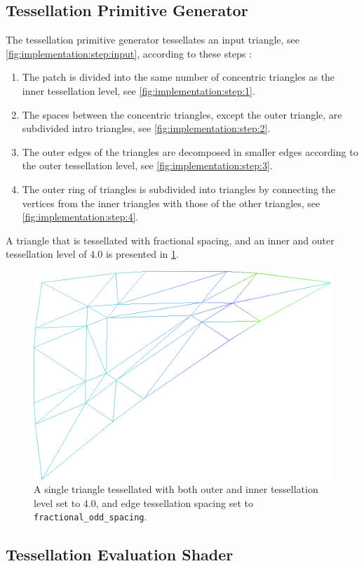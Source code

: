 \subsection{Tessellation Primitive Generator}
\label{ss:implementation:tpg}
	The tessellation primitive generator tessellates an input triangle, see \cref{fig:implementation:step:input}, according to these steps \cite{cozzi2012opengl}:
		\begin{enumerate}[label=(\roman*)]
			\item \label{it:implementation:1} The patch is divided into the same number of concentric triangles as the inner tessellation level, see \cref{fig:implementation:step:1}.
			\item \label{it:implementation:2} The spaces between the concentric triangles, except the outer triangle, are subdivided intro triangles, see \cref{fig:implementation:step:2}.
			\item \label{it:implementation:3} The outer edges of the triangles are decomposed in smaller edges according to the outer tessellation level, see \cref{fig:implementation:step:3}.
			\item \label{it:implementation:4} The outer ring of triangles is subdivided into triangles by connecting the vertices from the inner triangles with those of the other triangles, see \cref{fig:implementation:step:4}.
		\end{enumerate}
	A triangle that is tessellated with fractional spacing, and an inner and outer tessellation level of $4.0$ is presented in \cref{fig:implementation:tessellatedTriangle}.

	\begin{figure}[b]
		\centering
		\includegraphics[width=0.5\columnwidth]{content/img/implementation/tesselatedTriangle.png}
		\caption{A single triangle tessellated with both outer and inner tessellation level set to 4.0, and edge tessellation spacing set to \texttt{fractional\_odd\_spacing}.}
		\label{fig:implementation:tessellatedTriangle}
	\end{figure}



\subsection{Tessellation Evaluation Shader}
\label{ss:implementation:tes}


